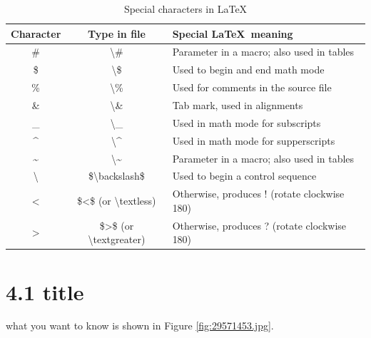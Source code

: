 \documentclass[12pt,openright]{book}
\begin{document}
\begin{center}
  \begin{table}[!htbp]
    \caption{Special characters in \LaTeX}
    \label{tab:special characters}
    \begin{tabular}{@{}ccl@{}}
      \toprule
      \textbf{Character} & \textbf{Type in file} & \textbf{Special \LaTeX\ meaning}  \\ 
      \midrule
      \#	& \textbackslash\# & Parameter in a macro; also used in tables \\
      \$	& \textbackslash\$ & Used to begin and end math mode \\
      \%	& \textbackslash\% & Used for comments in the source file \\
      \&	& \textbackslash\& & Tab mark, used in alignments \\
      \_	& \textbackslash\_ & Used in math mode for subscripts \\
      \^{}	& \textbackslash\^{} & Used in math mode for supperscripts \\
      \~{}	& \textbackslash\~{} & Parameter in a macro; also used in tables \\
      \textbackslash	& \$\textbackslash backslash\$ & Used to begin a control sequence \\
      $<$	& \$<\$ (or \textbackslash textless) & Otherwise, produces ! (rotate clockwise 180\degree) \\
      $>$	& \$>\$ (or \textbackslash textgreater) & Otherwise, produces ? (rotate clockwise 180\degree) \\
      \bottomrule
    \end{tabular}
  \end{table}
\end{center}

\section{4.1 title}

what you want to know is shown in Figure \ref{fig:29571453.jpg}.
\end{document}
